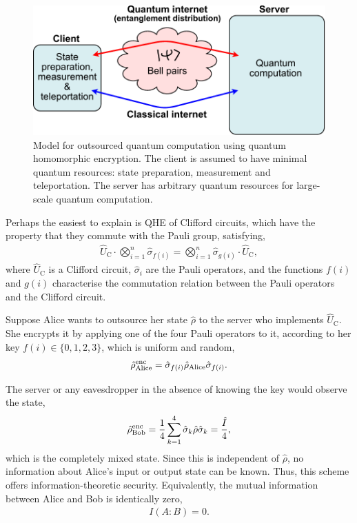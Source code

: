 \begin{figure}[!htb]
	\centering
	\includegraphics[width=\columnwidth]{figures/QC_outsourcing_model.pdf}
	\caption{Model for outsourced quantum computation using quantum homomorphic encryption. The client is assumed to have minimal quantum resources: state preparation, measurement and teleportation. The server has arbitrary quantum resources for large-scale quantum computation.} \label{fig:outsourcing}
\end{figure}

Perhaps the easiest to explain is QHE of Clifford circuits, which have the property that they commute with the Pauli group, satisfying,
\begin{align}
	\hat{U}_\mathrm{C} \cdot \bigotimes_{i=1}^n \hat{\sigma}_{f(i)} = \bigotimes_{i=1}^n \hat{\sigma}_{g(i)} \cdot \hat{U}_\mathrm{C},
\end{align}
where $\hat{U}_\mathrm{C}$ is a Clifford circuit, $\hat{\sigma}_i$ are the Pauli operators, and the functions $f(i)$ and $g(i)$ characterise the commutation relation between the Pauli operators and the Clifford circuit.

Suppose Alice wants to outsource her state $\hat\rho$ to the server who implements $\hat{U}_\mathrm{C}$. She encrypts it by applying one of the four Pauli operators to it, according to her key \mbox{$f(i)\in\{0,1,2,3\}$}, which is uniform and random,
\begin{align}
	\hat\rho_{\rm Alice}^{\rm enc} = \hat\sigma_{f(i)} \hat\rho_{\rm Alice} \hat\sigma_{f(i)}.
\end{align}

The server or any eavesdropper in the absence of knowing the key would observe the state,
\begin{align}
	\hat\rho_{\rm Bob}^{\rm enc} = \frac{1}{4}\sum_{k=1}^4 \hat\sigma_k \hat\rho \hat\sigma_k = \frac{\hat{I}}{4},
\end{align}
which is the completely mixed state. Since this is independent of $\hat\rho$, no information about Alice's input or output state can be known. Thus, this scheme offers information-theoretic security. Equivalently, the mutual information between Alice and Bob is identically zero,
\begin{align}
	I(A:B) = 0.	
\end{align}

